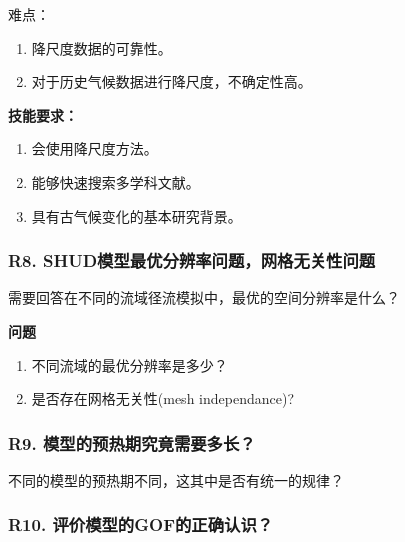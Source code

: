 \documentclass[
]{book}
\providecommand{\tightlist}{%
  \setlength{\itemsep}{0pt}\setlength{\parskip}{0pt}}
\begin{document}
难点：

\begin{enumerate}
\def\labelenumi{\arabic{enumi}.}
\tightlist
\item
  降尺度数据的可靠性。
\item
  对于历史气候数据进行降尺度，不确定性高。
\end{enumerate}

\textbf{技能要求：}

\begin{enumerate}
\def\labelenumi{\arabic{enumi}.}
\tightlist
\item
  会使用降尺度方法。
\item
  能够快速搜索多学科文献。
\item
  具有古气候变化的基本研究背景。
\end{enumerate}

\hypertarget{r8.-shudux6a21ux578bux6700ux4f18ux5206ux8fa8ux7387ux95eeux9898ux7f51ux683cux65e0ux5173ux6027ux95eeux9898}{%
\subsubsection{\texorpdfstring{\textbf{R8. SHUD模型最优分辨率问题，网格无关性问题}}{R8. SHUD模型最优分辨率问题，网格无关性问题}}\label{r8.-shudux6a21ux578bux6700ux4f18ux5206ux8fa8ux7387ux95eeux9898ux7f51ux683cux65e0ux5173ux6027ux95eeux9898}}

需要回答在不同的流域径流模拟中，最优的空间分辨率是什么？

\textbf{问题}

\begin{enumerate}
\def\labelenumi{\arabic{enumi}.}
\tightlist
\item
  不同流域的最优分辨率是多少？
\item
  是否存在网格无关性(mesh independance)?
\end{enumerate}

\hypertarget{r9.-ux6a21ux578bux7684ux9884ux70edux671fux7a76ux7adfux9700ux8981ux591aux957f}{%
\subsubsection{\texorpdfstring{\textbf{R9. 模型的预热期究竟需要多长？}}{R9. 模型的预热期究竟需要多长？}}\label{r9.-ux6a21ux578bux7684ux9884ux70edux671fux7a76ux7adfux9700ux8981ux591aux957f}}

不同的模型的预热期不同，这其中是否有统一的规律？

\hypertarget{r10.-ux8bc4ux4ef7ux6a21ux578bux7684gofux7684ux6b63ux786eux8ba4ux8bc6}{%
\subsubsection{\texorpdfstring{\textbf{R10. 评价模型的GOF的正确认识？}}{R10. 评价模型的GOF的正确认识？}}\label{r10.-ux8bc4ux4ef7ux6a21ux578bux7684gofux7684ux6b63ux786eux8ba4ux8bc6}}
\end{document}
